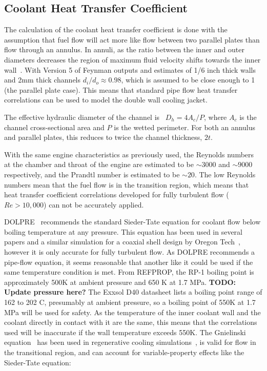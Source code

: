 \documentclass[11pt]{article}
\begin{document}
\subsection{Coolant Heat Transfer Coefficient}\label{sec:coefficient}
The calculation of the coolant heat transfer coefficient is done with the assumption that fuel flow will act more like flow between two parallel plates than flow through an annulus. In annuli, as the ratio between the inner and outer diameters decreases the region of maximum fluid velocity shifts towards the inner wall~\cite{gnielinski_heat_2009}. With Version 5 of Feynman outputs and estimates of 1/6 inch thick walls and 2mm thick channels $d_i / d_o \approx 0.98$, which is assumed to be close enough to 1 (the parallel plate case). This means that standard pipe flow heat transfer correlations can be used to model the double wall cooling jacket.

The effective hydraulic diameter of the channel is~\cite{bergman_fundamentals_2017} $D_h = 4A_c / P$, where $A_c$ is the channel cross-sectional area and $P$ is the wetted perimeter. For both an annulus and parallel plates, this reduces to twice the channel thickness, $2t$.

With the same engine characteristics as previously used, the Reynolds numbers at the chamber and throat of the engine are estimated to be $\sim 3000$ and $\sim 9000$ respectively, and the Prandtl number is estimated to be $\sim 20$. The low Reynolds numbers mean that the fuel flow is in the transition region, which means that heat transfer coefficient correlations developed for fully turbulent flow ($Re > 10,000$) can not be accurately applied.

DOLPRE~\cite{huang_modern_1992} recommends the standard Sieder-Tate equation for coolant flow below boiling temperature at any pressure. This equation has been used in several papers and a similar simulation for a coaxial shell design by Oregon Tech~\cite{minar_our_2017}, however it is only accurate for fully turbulent flow. As DOLPRE recommends a pipe-flow equation, it seems reasonable that another like it could be used if the same temperature condition is met. From REFPROP, the RP-1 boiling point is approximately 500K at ambient pressure and 650 K at 1.7 MPa. \textbf{TODO: Update pressure here?} The Exxsol D40 datasheet lists a boiling point range of 162 to 202 C, presumably at ambient pressure, so a boiling point of 550K at 1.7 MPa will be used for safety. As the temperature of the inner coolant wall and the coolant directly in contact with it are the same, this means that the correlations used will be inaccurate if the wall temperature exceeds 550K. The Gnielinski equation~\cite{gnielinski_neue_1975} has been used in regenerative cooling simulations~\cite{marchi_numerical_2004}, is valid for flow in the transitional region, and can account for variable-property effects like the Sieder-Tate equation:
\end{document}
